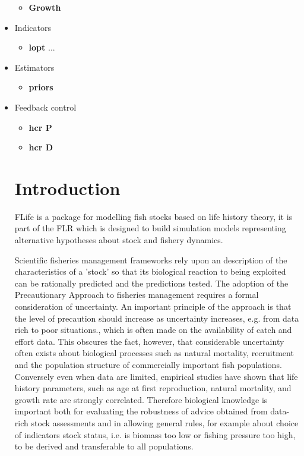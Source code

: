 \documentclass[]{article}
\begin{document}
\begin{itemize}
\begin{itemize}
    \item \textbf{Growth}  
\end{itemize}    
\item Indicators
\begin{itemize}
	\item \textbf{lopt} ...
\end{itemize}
\item Estimators
\begin{itemize}
	\item \textbf{priors}
\end{itemize}
\item Feedback control
\begin{itemize}
	\item \textbf{hcr P}
	\item \textbf{hcr D}
\end{itemize}

{
\hypersetup{linkcolor=black}
\setcounter{tocdepth}{2}
\tableofcontents
}
\newpage



\newpage
\section{Introduction}\label{introduction}

FLife is a package for modelling fish stocks based on life history theory, it is part of the FLR \citep{kell2007flr} which is designed to build simulation models representing alternative hypotheses about stock and fishery dynamics.

Scientific fisheries management frameworks rely upon an description of the characteristics of a 'stock' so that its biological reaction to being exploited can be rationally predicted and the predictions tested. The adoption of the Precautionary Approach to fisheries management \citep[PA,][]{garcia1996precautionary} requires a formal consideration of uncertainty. An important principle of the approach is that the level of precaution should increase as uncertainty increases, e.g. from data rich to poor situations., which is often made on the availability of catch and effort data. This obscures the fact, however, that considerable uncertainty often exists about biological processes such as natural mortality, recruitment and the population structure of commercially important fish populations. Conversely even when data are limited, empirical studies have shown that life history parameters, such as age at first reproduction, natural mortality, and growth rate are strongly correlated. Therefore biological knowledge is important both for evaluating the robustness of advice obtained from data-rich stock assessments and in allowing general rules, for example about choice of indicators stock status, i.e. is biomass too low or fishing pressure too high, to be derived and transferable to all populations. 


\end{itemize}
\end{document}
